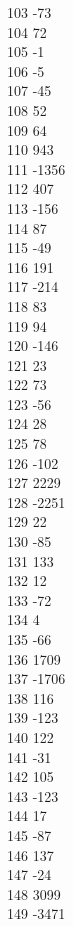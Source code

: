 { 103	-73 \\
 104	72 \\
 105	-1 \\
 106	-5 \\
 107	-45 \\
 108	52 \\
 109	64 \\
 110	943 \\
 111	-1356 \\
 112	407 \\
 113	-156 \\
 114	87 \\
 115	-49 \\
 116	191 \\
 117	-214 \\
 118	83 \\
 119	94 \\
 120	-146 \\
 121	23 \\
 122	73 \\
 123	-56 \\
 124	28 \\
 125	78 \\
 126	-102 \\
 127	2229 \\
 128	-2251 \\
 129	22 \\
 130	-85 \\
 131	133 \\
 132	12 \\
 133	-72 \\
 134	4 \\
 135	-66 \\
 136	1709 \\
 137	-1706 \\
 138	116 \\
 139	-123 \\
 140	122 \\
 141	-31 \\
 142	105 \\
 143	-123 \\
 144	17 \\
 145	-87 \\
 146	137 \\
 147	-24 \\
 148	3099 \\
 149	-3471 \\
}
